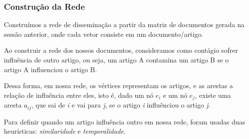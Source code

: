 \documentclass[a4paper,12pt]{article}
\begin{document}
\pagebreak
\subsubsection{Construção da Rede}

 Construímos a rede de disseminação a partir da matriz de documentos gerada na sessão anterior, onde cada vetor consiste em um documento/artigo.
 
 Ao construir a rede dos nossos documentos,
 consideramos como contágio sofrer influência de outro artigo, ou seja, um artigo A contamina um artigo B se o artigo A influenciou o
 artigo B.
 
 Dessa forma, em nossa rede, os vértices representam os artigos, e as arestas a relação de influência entre eles, isto é, dado um nó $e_{i}$ e um nó
 $e_{j}$, existe uma aresta $a_{ij}$, que sai de \textit{i} e vai para \textit{j}, se o artigo \textit{i} influênciou o artigo \textit{j}.
 
 Para definir quando um artigo influência outro em nossa rede, foram usadas duas heurísticas: \textit{similaridade} e 
 \textit{temporalidade}.
 
\end{document}
